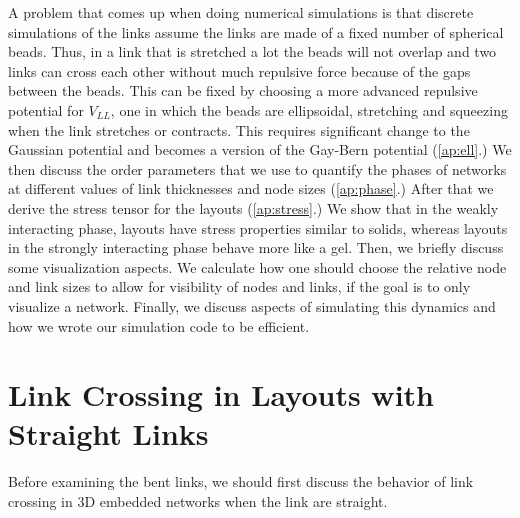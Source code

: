 \documentclass[nofootinbib,preprint,floatfix,titlepage,superscriptaddress]{revtex4} %
\newcommand{\outNim}[1]{}
\begin{document}
A problem that comes up when doing numerical simulations is that discrete simulations of the links assume the links are made of a fixed number of spherical beads. 
Thus, in a link that is stretched a lot the beads will not overlap and two links can cross each other without much repulsive force because of the gaps between the beads.  
This can be fixed by choosing a more advanced repulsive potential for $V_{LL}$, one in which the beads are ellipsoidal, stretching and squeezing when the link stretches or contracts. 
This requires significant change to the Gaussian potential and becomes a version of the Gay-Bern potential \citep{gay1981modification}  (\ref{ap:ell}.)
We then discuss the order parameters that we use to quantify the phases of networks at different values of link thicknesses and node sizes (\ref{ap:phase}.) 
After that we derive the stress tensor for the layouts (\ref{ap:stress}.) We show that in the weakly interacting phase, layouts have stress properties similar to solids, whereas layouts in the strongly interacting phase behave more like a gel. 
Then, we briefly discuss some visualization aspects. 
We calculate how one should choose the relative node and link sizes to allow for visibility of nodes and links, if the goal is to only visualize a network.  
Finally, we discuss aspects of simulating this dynamics and how we wrote our simulation code to be efficient. 

\outNim{
\section{Contrast with Literature on Polymers}
The difference between our work and the work of polymer scientists is that we are not concerned with temperature as a parameter. 
We wish to model phases of the system solely based on total density, i.e. density of links, and the network structure, which determines inter-linkages of links. 
Again, the motivation is that networks such as brain, %
have very small thermal fluctuations and what we care about is their static properties.

Physical properties such as stiffness and stress-tensor properties of the network are of course a function of such properties in the link fibers. But these properties will not impact the occupied volume and overall density and thus we are not concerned with them here. 
}

\section{Link Crossing in Layouts with Straight Links \label{ap:cross}}
Before examining the bent links, we should first discuss the behavior of link crossing in 3D embedded networks when the link are straight. 
\end{document}
